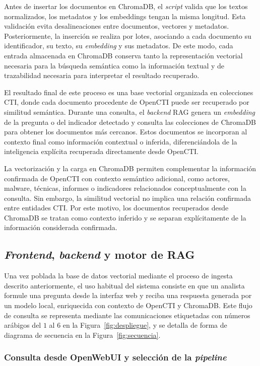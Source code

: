 \documentclass[12pt]{report}
\begin{document}
Antes de insertar los documentos en ChromaDB, el \textit{script} valida que los textos normalizados, los metadatos y los embeddings tengan la misma longitud. Esta validación evita desalineaciones entre documentos, vectores y metadatos. Posteriormente, la inserción se realiza por lotes, asociando a cada documento su identificador, su texto, su \textit{embedding} y sus metadatos. De este modo, cada entrada almacenada en ChromaDB conserva tanto la representación vectorial necesaria para la búsqueda semántica como la información textual y de trazabilidad necesaria para interpretar el resultado recuperado.

El resultado final de este proceso es una base vectorial organizada en colecciones CTI, donde cada documento procedente de OpenCTI puede ser recuperado por similitud semántica. Durante una consulta, el \textit{backend} RAG genera un \textit{embedding} de la pregunta o del indicador detectado y consulta las colecciones de ChromaDB para obtener los documentos más cercanos. Estos documentos se incorporan al contexto final como información contextual o inferida, diferenciándola de la inteligencia explícita recuperada directamente desde OpenCTI.

La vectorización y la carga en ChromaDB permiten complementar la información confirmada de OpenCTI con contexto semántico adicional, como actores, malware, técnicas, informes o indicadores relacionados conceptualmente con la consulta. Sin embargo, la similitud vectorial no implica una relación confirmada entre entidades CTI. Por este motivo, los documentos recuperados desde ChromaDB se tratan como contexto inferido y se separan explícitamente de la información considerada confirmada.

\subsection{\textit{Frontend}, \textit{backend} y motor de RAG}
Una vez poblada la base de datos vectorial mediante el proceso de ingesta descrito anteriormente, el uso habitual del sistema consiste en que un analista formule una pregunta desde la interfaz web y reciba una respuesta generada por un modelo local, enriquecida con contexto de OpenCTI y ChromaDB. Este flujo de consulta se representa mediante las comunicaciones etiquetadas con números arábigos del $1$ al $6$ en la Figura~\ref{fig:despliegue}, y se detalla de forma de diagrama de secuencia en la Figura~\ref{fig:secuencia}.

\subsubsection*{Consulta desde OpenWebUI y selección de la \textit{pipeline}}
\end{document}
